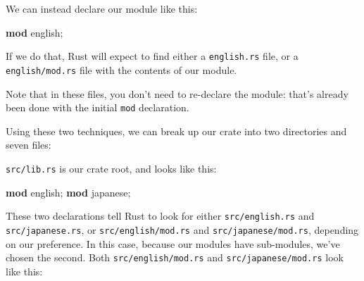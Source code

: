 \documentclass[a4paper,]{book}
\newenvironment{Shaded}{\begin{snugshade}}{\end{snugshade}}
\newcommand{\KeywordTok}[1]{\textcolor[rgb]{0.13,0.29,0.53}{\textbf{{#1}}}}
\newcommand{\NormalTok}[1]{{#1}}
\begin{document}
We can instead declare our module like this:

\begin{Shaded}
\begin{Highlighting}[]
\KeywordTok{mod} \NormalTok{english;}
\end{Highlighting}
\end{Shaded}

If we do that, Rust will expect to find either a \texttt{english.rs}
file, or a \texttt{english/mod.rs} file with the contents of our module.

Note that in these files, you don't need to re-declare the module:
that's already been done with the initial \texttt{mod} declaration.

Using these two techniques, we can break up our crate into two
directories and seven files:

\begin{Shaded}
\end{Shaded}

\texttt{src/lib.rs} is our crate root, and looks like this:

\begin{Shaded}
\begin{Highlighting}[]
\KeywordTok{mod} \NormalTok{english;}
\KeywordTok{mod} \NormalTok{japanese;}
\end{Highlighting}
\end{Shaded}

These two declarations tell Rust to look for either
\texttt{src/english.rs} and \texttt{src/japanese.rs}, or
\texttt{src/english/mod.rs} and \texttt{src/japanese/mod.rs}, depending
on our preference. In this case, because our modules have sub-modules,
we've chosen the second. Both \texttt{src/english/mod.rs} and
\texttt{src/japanese/mod.rs} look like this:
\end{document}
